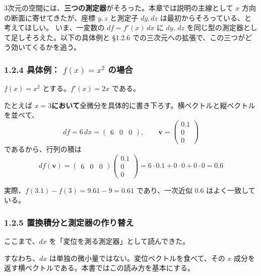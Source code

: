 \documentclass[a4paper,12pt,openany]{book}
\begin{document}
3次元の空間には、\textbf{三つの測定器}がそろった。本章では説明の主線として
\(x\) 方向の断面に寄せてきたが、座標 \(y,z\) と測定子 \(dy,dz\)
は最初からそろっている、と考えてほしい。 いま、一変数の \(df=f'(x)\,dx\)
に \(dy\), \(dz\) を同じ型の測定器として足しそろえた。以下の具体例と
§1.2.6 での三次元への拡張で、この三つがどう効いてくるかを追う。

\hypertarget{ux5177ux4f53ux4f8b-fx-x2-ux306eux5834ux5408}{%
\subsubsection{\texorpdfstring{1.2.4 具体例： \(f(x) = x^2\)
の場合}{1.2.4 具体例： f(x) = x\^{}2 の場合}}\label{ux5177ux4f53ux4f8b-fx-x2-ux306eux5834ux5408}}

\(f(x) = x^2\) とする。\(f'(x) = 2x\) である。

たとえば
\(x=3\)\textbf{において}全微分を具体的に書き下ろす。横ベクトルと縦ベクトルを並べて、
\[df = 6\,dx = \begin{pmatrix} 6 & 0 & 0 \end{pmatrix}, \qquad \mathbf{v} = \begin{pmatrix} 0.1 \\ 0 \\ 0 \end{pmatrix}\]
であるから、行列の積は
\[df(\mathbf{v}) = \begin{pmatrix} 6 & 0 & 0 \end{pmatrix} \begin{pmatrix} 0.1 \\ 0 \\ 0 \end{pmatrix} = 6\cdot 0.1 + 0\cdot 0 + 0\cdot 0 = 0.6\]

実際、\(f(3.1) - f(3) = 9.61 - 9 = 0.61\) であり、一次近似 \(0.6\)
はよく一致している。

\hypertarget{ux7f6eux63dbux7a4dux5206ux3068ux6e2cux5b9aux5668ux306eux4f5cux308aux66ffux3048}{%
\subsubsection{1.2.5
置換積分と測定器の作り替え}\label{ux7f6eux63dbux7a4dux5206ux3068ux6e2cux5b9aux5668ux306eux4f5cux308aux66ffux3048}}

ここまで、\(dx\) を「変位を測る測定器」として読んできた。

すなわち、\(dx\) は単独の微小量ではない。変位ベクトルを食べて、その
\(x\) 成分を返す横ベクトルである。本書ではこの読み方を基本にする。
\end{document}
